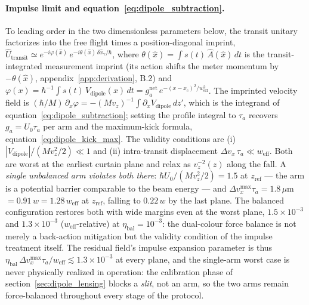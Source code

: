 \documentclass[11pt,a4paper]{article}
\begin{document}
\paragraph{Impulse limit and equation~\eqref{eq:dipole_subtraction}.} To leading order in the two dimensionless parameters below, the transit unitary factorizes into the free flight times a position-diagonal imprint, $\hat U_\text{transit} \simeq e^{-i\varphi(\hat x)}\,e^{-i\theta(\hat x)\,\delta\hat x_\gamma/\hbar}$, where $\theta(\hat x) = \int s(t)\,\hat A(\hat x)\,dt$ is the transit-integrated measurement imprint (its action shifts the meter momentum by $-\theta(\hat x)$, appendix~\ref{app:derivation}, B.2) and $\varphi(x) = \hbar^{-1}\!\int s(t)\,V_\text{dipole}(x)\,dt = g_a^\text{net}\, e^{-(x-x_c)^2/w_\text{eff}^2}$. The imprinted velocity field is $(\hbar/M)\,\partial_x\varphi = -(Mv_z)^{-1}\!\int \partial_x V_\text{dipole}\,dz'$, which is the integrand of equation~\eqref{eq:dipole_subtraction}; setting the profile integral to $\tau_a$ recovers $g_a = U_0\tau_a$ per arm and the maximum-kick formula, equation~\eqref{eq:dipole_kick_max}. The validity conditions are (i) $|V_\text{dipole}|/(Mv_z^2/2) \ll 1$ and (ii) intra-transit displacement $\Delta v_x\,\tau_a \ll w_\text{eff}$. Both are worst at the earliest curtain plane and relax as $v_z^{-2}(z)$ along the fall. A \emph{single unbalanced arm violates both there}: $\hbar U_0/(Mv_z^2/2) = 1.5$ at $z_\text{ref}$ --- the arm is a potential barrier comparable to the beam energy --- and $\Delta v_x^\text{max}\tau_a = 1.8\,\mu$m $= 0.91\,w = 1.28\,w_\text{eff}$ at $z_\text{ref}$, falling to $0.22\,w$ by the last plane. The balanced configuration restores both with wide margins even at the worst plane, $1.5\times 10^{-3}$ and $1.3\times 10^{-3}$ ($w_\text{eff}$-relative) at $\eta_\text{bal} = 10^{-3}$: the dual-colour force balance is not merely a back-action mitigation but the validity condition of the impulse treatment itself. The residual field's impulse expansion parameter is thus $\eta_\text{bal}\,\Delta v_x^\text{max}\tau_a/w_\text{eff} \lesssim 1.3\times 10^{-3}$ at every plane, and the single-arm worst case is never physically realized in operation: the calibration phase of section~\ref{sec:dipole_lensing} blocks a \emph{slit}, not an arm, so the two arms remain force-balanced throughout every stage of the protocol.
\end{document}
